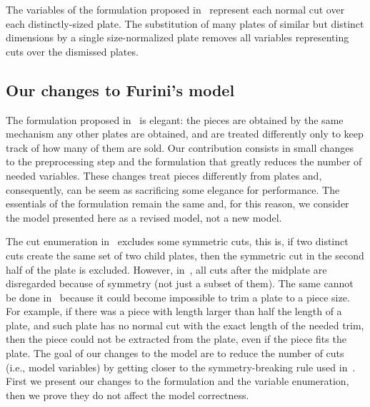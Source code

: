 \documentclass[runningheads]{llncs}
\begin{document}
The variables of the formulation proposed in~\cite{furini:2016} represent each normal cut over each distinctly-sized plate.
The substitution of many plates of similar but distinct dimensions by a single size-normalized plate removes all variables representing cuts over the dismissed plates.

\subsection{Our changes to Furini's model}

% 

The formulation proposed in~\cite{furini:2016} is elegant: the pieces are obtained by the same mechanism any other plates are obtained, and are treated differently only to keep track of how many of them are sold.
Our contribution consists in small changes to the preprocessing step and the formulation that greatly reduces the number of needed variables.
These changes treat pieces differently from plates and, consequently, can be seem as sacrificing some elegance for performance.
The essentials of the formulation remain the same and, for this reason, we consider the model presented here as a revised model, not a new model.


The cut enumeration in~\cite{furini:2016} excludes some symmetric cuts, this is, if two distinct cuts create the same set of two child plates, then the symmetric cut in the second half of the plate is excluded.
However, in~\cite{nicos:1977}, all cuts after the midplate are disregarded because of symmetry (not just a subset of them).
The same cannot be done in~\cite{furini:2016} because it could become impossible to trim a plate to a piece size.
For example, if there was a piece with length larger than half the length of a plate, and such plate has no normal cut with the exact length of the needed trim, then the piece could not be extracted from the plate, even if the piece fits the plate.
The goal of our changes to the model are to reduce the number of cuts (i.e., model variables) by getting closer to the symmetry-breaking rule used in~\cite{nicos:1977}.
First we present our changes to the formulation and the variable enumeration, then we prove they do not affect the model correctness.
\end{document}
